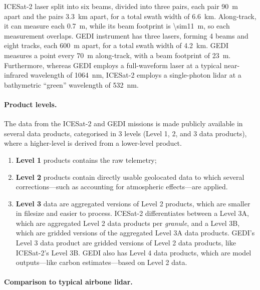 %

ICESat-2 laser split into six beams, divided into three pairs, each pair \qty{90}{m} apart and the pairs \qty{3.3}{km} apart, for a total swath width of \qty{6.6}{km}.
Along-track, it can measure each \qty{0.7}{m}, while its beam footprint is \qty{\sim11}{m}, so each measurement overlaps.
GEDI instrument has three lasers, forming 4 beams and eight tracks, each \qty{600}{m} apart, for a total swath width of \qty{4.2}{km}.
GEDI measures a point every \qty{70}{m} along-track, with a beam footprint of \qty{23}{m}.
Furthermore, whereas GEDI employs a full-waveform laser at a typical near-infrared wavelength of \qty{1064}{nm}, ICESat-2 employs a single-photon lidar at a bathymetric ``green'' wavelength of \qty{532}{nm}.


\paragraph{Product levels.}
The data from the ICESat-2 and GEDI missions is made publicly available in several data products, categorised in 3 levels (Level 1, 2, and 3 data products), where a higher-level is derived from a lower-level product.
\begin{enumerate}
  \item \textbf{Level 1} products contains the raw telemetry;
  \item \textbf{Level 2} products contain directly usable geolocated data to which several corrections---such as accounting for atmospheric effects---are applied.
  \item \textbf{Level 3} data are aggregated versions of Level 2 products, which are smaller in filesize and easier to process.
        ICESat-2 differentiates between a Level 3A, which are aggregated Level 2 data products per \emph{granule}, and a Level 3B, which are gridded versions of the aggregated Level 3A data products.
        GEDI's Level 3 data product are gridded versions of Level 2 data products, like ICESat-2's Level 3B.
        GEDI also has Level 4 data products, which are model outputs---like carbon estimates---based on Level 2 data.
\end{enumerate}


\paragraph{Comparison to typical airbone lidar.}

